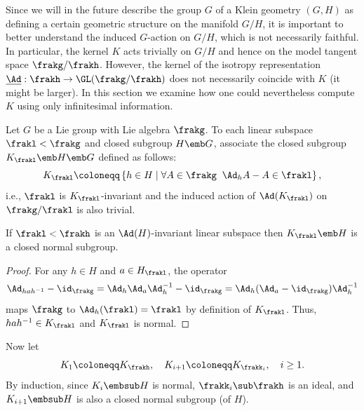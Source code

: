 Since we will in the future describe the group $G$ of a Klein geometry $(G,H)$ as defining a certain geometric structure on the manifold $G\slash H$, it is important to better understand the induced $G$-action on $G\slash H$, which is not necessarily faithful. In particular, the kernel $K$ acts trivially on $G\slash H$ and hence on the model tangent space $\frakg\slash\frakh$. However, the kernel of the isotropy representation $\underline{\Ad}:\frakh\to \GL(\frakg\slash\frakh)$ does not necessarily coincide with $K$ (it might be larger). In this section we examine how one could nevertheless compute $K$ using only infinitesimal information.

Let $G$ be a Lie group with Lie algebra $\frakg$. To each linear subspace $\frakl<\frakg$ and closed subgroup $H\emb G$, associate the closed subgroup $K_\frakl\emb H\emb G$ defined as follows:
\[K_\frakl\coloneqq \left\{h\in H\mid \forall A\in\frakg\;\; \Ad_h A-A\in \frakl\right\},\]
i.e., $\frakl$ is $K_\frakl$-invariant and the induced action of $\Ad(K_\frakl)$ on $\frakg\slash\frakl$ is also trivial.

\begin{lem}
    If $\frakl<\frakh$ is an $\Ad(H)$-invariant linear subspace then $K_\frakl\emb H$ is a closed normal subgroup.
\end{lem}
\begin{proof}
    For any $h\in H$ and $a\in H_\frakl$, the operator
    \[\Ad_{hah^{-1}}-\id_\frakg=\Ad_h\Ad_a\Ad_h^{-1}-\id_\frakg=\Ad_h(\Ad_a-\id_\frakg)\Ad_h^{-1}\]
    maps $\frakg$ to $\Ad_h (\frakl)=\frakl$ by definition of $K_\frakl$. Thus, $hah^{-1}\in K_\frakl$ and $K_\frakl$ is normal.
\end{proof}

Now let 
\[K_1\coloneqq K_{\frakh},\quad K_{i+1}\coloneqq K_{\frakk_i},\quad i\geq 1.\]
By induction, since $K_i\embsub H$ is normal, $\frakk_i\sub \frakh$ is an ideal, and $K_{i+1}\embsub H$ is also a closed normal subgroup (of $H$).

